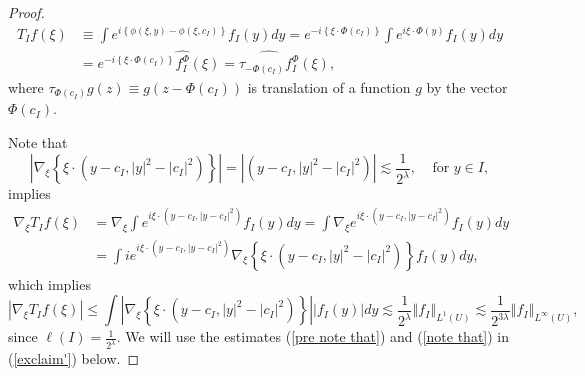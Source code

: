 \documentclass{amsart}%
\theoremstyle{plain}
\numberwithin{equation}{section}
\begin{document}
\begin{proof}
\begin{align}
T_{I}f\left(  \xi\right)   &  \equiv\int e^{i\left\{  \phi\left(
\xi,y\right)  -\phi\left(  \xi,c_{I}\right)  \right\}  }f_{I}\left(  y\right)
dy=e^{-i\left\{  \xi\cdot\Phi\left(  c_{I}\right)  \right\}  }\int
e^{i\xi\cdot\Phi\left(  y\right)  }f_{I}\left(  y\right)  dy\label{def T_I}\\
&  =e^{-i\left\{  \xi\cdot\Phi\left(  c_{I}\right)  \right\}  }\widehat
{f_{I}^{\Phi}}\left(  \xi\right)  =\widehat{\tau_{-\Phi\left(  c_{I}\right)
}f_{I}^{\Phi}}\left(  \xi\right)  ,\nonumber
\end{align}
where $\tau_{\Phi\left(  c_{I}\right)  }g\left(  z\right)  \equiv g\left(
z-\Phi\left(  c_{I}\right)  \right)  $ is translation of a function $g$ by the
vector $\Phi\left(  c_{I}\right)  $.

Note that%
\[
\left\vert \nabla_{\xi}\left\{  \xi\cdot\left(  y-c_{I},\left\vert
y\right\vert ^{2}-\left\vert c_{I}\right\vert ^{2}\right)  \right\}
\right\vert =\left\vert \left(  y-c_{I},\left\vert y\right\vert ^{2}%
-\left\vert c_{I}\right\vert ^{2}\right)  \right\vert \lesssim\frac
{1}{2^{\lambda}},\ \ \ \ \ \text{for }y\in I,
\]
implies%
\begin{align}
\nabla_{\xi}T_{I}f\left(  \xi\right)   &  =\nabla_{\xi}\int e^{i\xi
\cdot\left(  y-c_{I},\left\vert y-c_{I}\right\vert ^{2}\right)  }f_{I}\left(
y\right)  dy=\int\nabla_{\xi}e^{i\xi\cdot\left(  y-c_{I},\left\vert
y-c_{I}\right\vert ^{2}\right)  }f_{I}\left(  y\right)
dy\label{pre note that}\\
&  =\int ie^{i\xi\cdot\left(  y-c_{I},\left\vert y-c_{I}\right\vert
^{2}\right)  }\nabla_{\xi}\left\{  \xi\cdot\left(  y-c_{I},\left\vert
y\right\vert ^{2}-\left\vert c_{I}\right\vert ^{2}\right)  \right\}
f_{I}\left(  y\right)  dy,\nonumber
\end{align}
which implies%
\begin{equation}
\left\vert \nabla_{\xi}T_{I}f\left(  \xi\right)  \right\vert \leq
\int\left\vert \nabla_{\xi}\left\{  \xi\cdot\left(  y-c_{I},\left\vert
y\right\vert ^{2}-\left\vert c_{I}\right\vert ^{2}\right)  \right\}
\right\vert \left\vert f_{I}\left(  y\right)  \right\vert dy\lesssim\frac
{1}{2^{\lambda}}\left\Vert f_{I}\right\Vert _{L^{1}\left(  U\right)  }%
\lesssim\frac{1}{2^{3\lambda}}\left\Vert f_{I}\right\Vert _{L^{\infty}\left(
U\right)  },\label{note that}%
\end{equation}
since $\ell\left(  I\right)  =\frac{1}{2^{\lambda}}$. We will use the
estimates (\ref{pre note that}) and (\ref{note that}) in (\ref{exclaim'}) below.


\end{proof}
\end{document}

